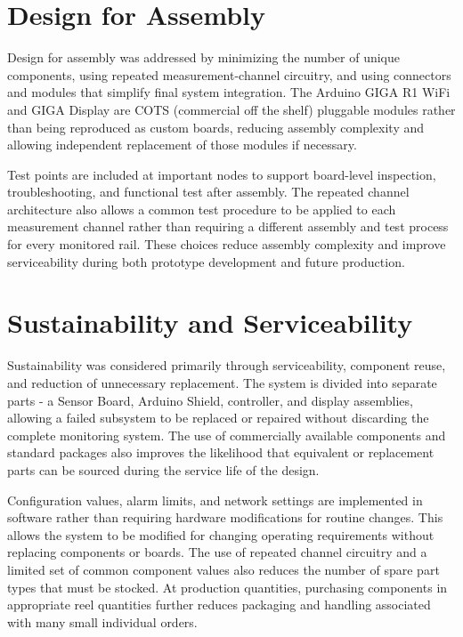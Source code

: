 \begin{weekthreechange}
    \section{Design for Assembly}

    Design for assembly was addressed by minimizing the number of unique components, using repeated measurement-channel circuitry, and using connectors and modules that simplify final system integration. The Arduino GIGA R1 WiFi and GIGA Display are COTS (commercial off the shelf) pluggable modules rather than being reproduced as custom boards, reducing assembly complexity and allowing independent replacement of those modules if necessary.

    Test points are included at important nodes to support board-level     inspection, troubleshooting, and functional test after assembly. The repeated channel architecture also allows a common test procedure to be applied to each measurement channel rather than requiring a different assembly and test process for every monitored rail. These choices reduce assembly complexity and improve serviceability during both prototype development and future production.

    \section{Sustainability and Serviceability}
    Sustainability was considered primarily through serviceability, component reuse, and reduction of unnecessary replacement. The system is divided into separate parts - a Sensor Board, Arduino Shield, controller, and display assemblies, allowing a failed subsystem to be replaced or repaired without discarding the complete monitoring system. The use of commercially available components and standard packages also improves the likelihood that equivalent or replacement parts can be sourced during the service life of the design.

    Configuration values, alarm limits, and network settings are implemented in
    software rather than requiring hardware modifications for routine changes. This allows the system to be modified for changing operating requirements without replacing components or boards. The use of repeated channel circuitry and a limited set of common component values also reduces the number of spare part types that must be stocked. At production quantities, purchasing components in appropriate reel quantities further reduces packaging and handling associated with many small individual orders.


\end{weekthreechange}
